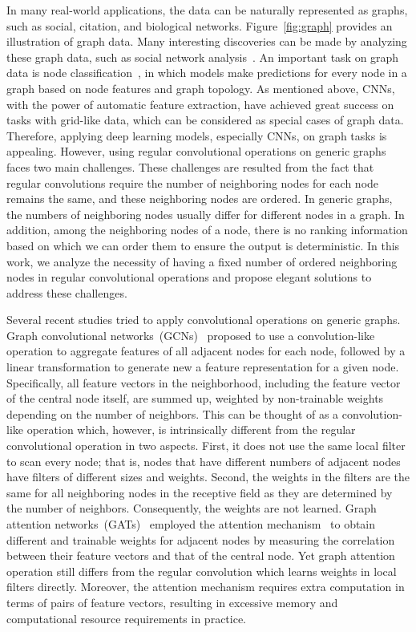 \documentclass[sigconf]{acmart}
\begin{document}
In many real-world applications, the data can be naturally
represented as graphs, such as social, citation, and biological
networks. Figure~\ref{fig:graph} provides an illustration of graph
data. Many interesting discoveries can be made by analyzing these
graph data, such as social network
analysis~\cite{grover2016node2vec}. An important task on graph data
is node classification~\cite{kipf2016semi,velivckovic2017graph}, in
which models make predictions for every node in a graph based on
node features and graph topology. As mentioned above, CNNs, with the
power of automatic feature extraction, have achieved great success
on tasks with grid-like data, which can be considered as special
cases of graph data. Therefore, applying deep learning models,
especially CNNs, on graph tasks is appealing. However, using regular
convolutional operations on generic graphs faces two main
challenges. These challenges are resulted from the fact that regular
convolutions require the number of neighboring nodes for each node
remains the same, and these neighboring nodes are ordered. In
generic graphs, the numbers of neighboring nodes usually differ for
different nodes in a graph. In addition, among the neighboring nodes
of a node, there is no ranking information based on which we can
order them to ensure the output is deterministic. In this work, we
analyze the necessity of having a fixed number of ordered
neighboring nodes in regular convolutional operations and propose
elegant solutions to address these challenges.


Several recent studies tried to apply convolutional operations on
generic graphs. Graph convolutional
networks~(GCNs)~\cite{kipf2016semi} proposed to use a
convolution-like operation to aggregate features of all adjacent
nodes for each node, followed by a linear transformation to generate
new a feature representation for a given node. Specifically, all
feature vectors in the neighborhood, including the feature vector of
the central node itself, are summed up, weighted by non-trainable
weights depending on the number of neighbors. This can be thought of
as a convolution-like operation which, however, is intrinsically
different from the regular convolutional operation in two aspects.
First, it does not use the same local filter to scan every node;
that is, nodes that have different numbers of adjacent nodes have
filters of different sizes and weights. Second, the weights in the
filters are the same for all neighboring nodes in the receptive
field as they are determined by the number of neighbors.
Consequently, the weights are not learned. Graph attention
networks~(GATs)~\cite{velivckovic2017graph} employed the attention
mechanism~\cite{bahdanau2014neural} to obtain different and
trainable weights for adjacent nodes by measuring the correlation
between their feature vectors and that of the central node. Yet
graph attention operation still differs from the regular convolution
which learns weights in local filters directly. Moreover, the
attention mechanism requires extra computation in terms of pairs of
feature vectors, resulting in excessive memory and computational
resource requirements in practice.
\end{document}
